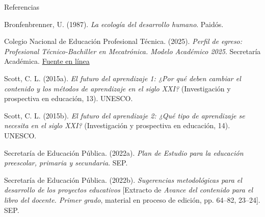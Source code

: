 \documentclass[
	spanish,
	aspectratio=1610,
	xcolor={dvipsnames,table}
]{beamer}
\begin{document}
\begin{frame}{Referencias}
\fontsize{9}{11}\selectfont\raggedright 
{\setlength{\parskip}{6pt}
\par\hangindent=1.27cm  Bronfenbrenner, U. (1987). \textit{La ecología del desarrollo humano}. Paidós.
\par\hangindent=1.27cm Colegio Nacional de Educación Profesional Técnica. (2025). \textit{Perfil de egreso: Profesional Técnico-Bachiller en Mecatrónica. Modelo Académico 2025}. Secretaría Académica. \href{https://www.conalep.edu.mx/sites/default/files/micrositios/perfil_egreso_2025/ElectyElectro/PE25_Mecatr\%C3\%B3nica.pdf}{Fuente en línea}
\par\hangindent=1.27cm  Scott, C. L. (2015a). \textit{El futuro del aprendizaje 1: ¿Por qué deben cambiar el contenido y los métodos de aprendizaje en el siglo XXI?} (Investigación y prospectiva en educación, 13). UNESCO.
\par\hangindent=1.27cm  Scott, C. L. (2015b). \textit{El futuro del aprendizaje 2: ¿Qué tipo de aprendizaje se necesita en el siglo XXI?} (Investigación y prospectiva en educación, 14). UNESCO.
\par\hangindent=1.27cm  Secretaría de Educación Pública. (2022a). \textit{Plan de Estudio para la educación preescolar, primaria y secundaria}. SEP.
\par\hangindent=1.27cm  Secretaría de Educación Pública. (2022b). \textit{Sugerencias metodológicas para el desarrollo de los proyectos educativos} [Extracto de \textit{Avance del contenido para el libro del docente. Primer grado}, material en proceso de edición, pp. 64--82, 23--24]. SEP.
}


\end{frame}
\end{document}
